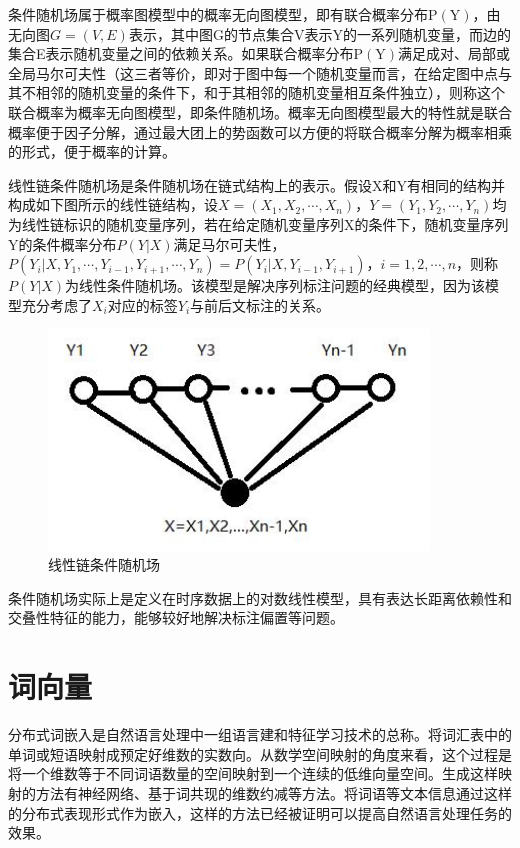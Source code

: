 \documentclass[winfonts,master,oneside,nobackinfo]{njuthesis}
\begin{document}
条件随机场属于概率图模型中的概率无向图模型，即有联合概率分布$\mathrm { P } (\mathrm { Y } )$，由无向图$G = ( V , E )$表示，其中图G的节点集合V表示Y的一系列随机变量，而边的集合E表示随机变量之间的依赖关系。如果联合概率分布$\mathrm { P } (\mathrm { Y } )$满足成对、局部或全局马尔可夫性（这三者等价，即对于图中每一个随机变量而言，在给定图中点与其不相邻的随机变量的条件下，和于其相邻的随机变量相互条件独立），则称这个联合概率为概率无向图模型，即条件随机场。概率无向图模型最大的特性就是联合概率便于因子分解，通过最大团上的势函数可以方便的将联合概率分解为概率相乘的形式，便于概率的计算。

线性链条件随机场是条件随机场在链式结构上的表示。假设X和Y有相同的结构并构成如下图所示的线性链结构，设$X = \left( X _ { 1 } , X _ { 2 } , \cdots , X _ { n } \right)$，$Y = \left( Y _ { 1 } , Y _ { 2 } , \cdots , Y _ { n } \right)$均为线性链标识的随机变量序列，若在给定随机变量序列X的条件下，随机变量序列Y的条件概率分布$P ( Y | X )$满足马尔可夫性，$P \left( Y _ { i } | X , Y _ { 1 } , \cdots , Y _ { i - 1 } , Y _ { i + 1 } , \cdots , Y _ { n } \right) = P \left( Y _ { i } | X , Y _ { i - 1 } , Y _ { i + 1 } \right)$，$i = 1,2 , \cdots , n$，则称$P ( Y | X )$为线性条件随机场。该模型是解决序列标注问题的经典模型，因为该模型充分考虑了$X _ { i }$对应的标签$Y _ { i }$与前后文标注的关系。

\begin{figure}[h]
\centering
\begin{minipage}[t]{0.5\textwidth}
\includegraphics[width=0.9\textwidth]{./figure/线性链条件随机场.jpg}
\caption{线性链条件随机场}
\label{lab:1}
\end{minipage}
\end{figure}

条件随机场实际上是定义在时序数据上的对数线性模型，具有表达长距离依赖性和交叠性特征的能力，能够较好地解决标注偏置等问题。

\section{词向量}
分布式词嵌入是自然语言处理中一组语言建和特征学习技术的总称。将词汇表中的单词或短语映射成预定好维数的实数向。从数学空间映射的角度来看，这个过程是将一个维数等于不同词语数量的空间映射到一个连续的低维向量空间。生成这样映射的方法有神经网络、基于词共现的维数约减等方法。将词语等文本信息通过这样的分布式表现形式作为嵌入，这样的方法已经被证明可以提高自然语言处理任务的效果。
\end{document}
